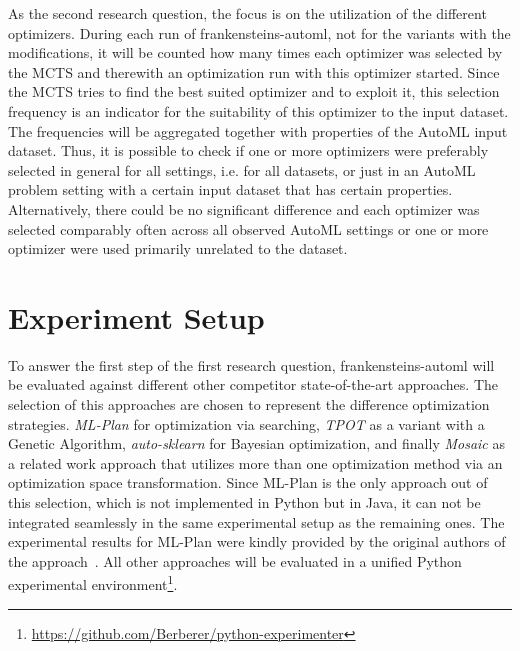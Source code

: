 As the second research question, the focus is on the utilization of the different optimizers.
During each run of frankensteins-automl, not for the variants with the modifications, it will be counted how many times each optimizer was selected by the MCTS and therewith an optimization run with this optimizer started.
Since the MCTS tries to find the best suited optimizer and to exploit it, this selection frequency is an indicator for the suitability of this optimizer to the input dataset.\newline
The frequencies will be aggregated together with properties of the AutoML input dataset.
Thus, it is possible to check if one or more optimizers were preferably selected in general for all settings, i.e. for all datasets, or just in an AutoML problem setting with a certain input dataset that has certain properties.
Alternatively, there could be no significant difference and each optimizer was selected comparably often across all observed AutoML settings or one or more optimizer were used primarily unrelated to the dataset.

\section{Experiment Setup}
\label{sec:evaluation:setup}
To answer the first step of the first research question, frankensteins-automl will be evaluated against different other competitor state-of-the-art approaches.
The selection of this approaches are chosen to represent the difference optimization strategies.
\textit{ML-Plan} for optimization via searching, \textit{TPOT} as a variant with a Genetic Algorithm, \textit{auto-sklearn} for Bayesian optimization, and finally \textit{Mosaic} as a related work approach that utilizes more than one optimization method via an optimization space transformation.\newline
Since ML-Plan is the only approach out of this selection, which is not implemented in Python but in Java, it can not be integrated seamlessly in the same experimental setup as the remaining ones.
The experimental results for ML-Plan were kindly provided by the original authors of the approach~\textcite{Mohr-ML-Plan}.
All other approaches will be evaluated in a unified Python experimental environment\footnote{\url{https://github.com/Berberer/python-experimenter}}.

